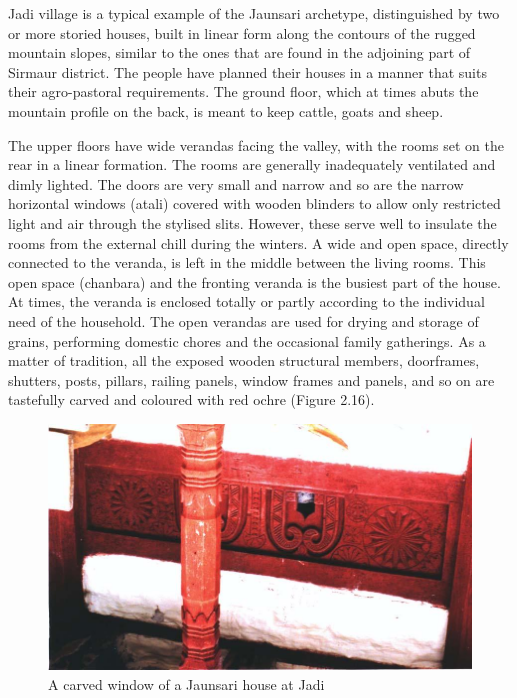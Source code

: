 Jadi village is a typical example of the Jaunsari archetype, distinguished by two or more storied houses, built in linear form along the contours of the rugged mountain slopes, similar to the ones that are found in the adjoining part of Sirmaur district. The people have planned their houses in a manner that suits their agro-pastoral requirements. The ground floor, which at times abuts the mountain profile on the back, is meant to keep cattle, goats and sheep.

The upper floors have wide verandas facing the valley, with the rooms set on the rear in a linear formation. The rooms are generally inadequately ventilated and dimly lighted. The doors are very small and narrow and so are the narrow horizontal windows (atali) covered with wooden blinders to allow only restricted light and air through the stylised slits. However, these serve well to insulate the rooms from the external chill during the winters. A wide and open space, directly connected to the veranda, is left in the middle between the living rooms. This open space (chanbara) and the fronting veranda is the busiest part of the house. At times, the veranda is enclosed totally or partly according to the individual need of the household. The open verandas are used for drying and storage of grains, performing domestic chores and the occasional family gatherings. As a matter of tradition, all the exposed wooden structural members, doorframes, shutters, posts, pillars, railing panels, window frames and panels, and so on are tastefully carved and coloured with red ochre (Figure 2.16).

\begin{figure}[!htbp]
\includegraphics[scale=.3]{images/chap02-16.jpg}
\caption{A carved window of a Jaunsari house at Jadi}\label{chap02-fig16}
\end{figure}

